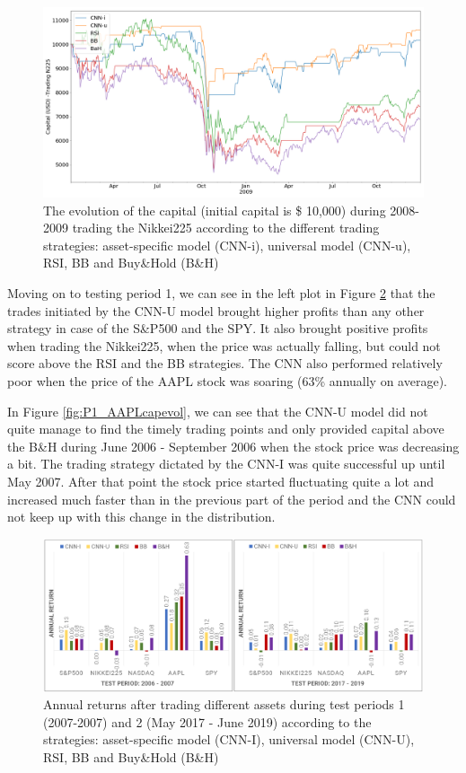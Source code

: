 \documentclass[11pt, a4paper]{article}
\begin{document}
\begin{figure}[ht]
    \centering
    \includegraphics[width=\textwidth]{images/capitals/Capitals2_N225.png}
    \caption{The evolution of the capital (initial capital is \$ 10,000) during 2008-2009 trading the Nikkei225 according to the different trading strategies: asset-specific model (CNN-i), universal model (CNN-u), RSI, BB and Buy\&Hold (B\&H)}
    \label{fig:N225capevol}
\end{figure}

Moving on to testing period 1, we can see in the left plot in Figure \ref{fig:CNNvsComp_P1P3} that the trades initiated by the CNN-U model brought higher profits than any other strategy in case of the S\&P500 and the SPY. It also brought positive profits when trading the Nikkei225, when the price was actually falling, but could not score above the RSI and the BB strategies. The CNN also performed relatively poor when the price of the AAPL stock was soaring (63\% annually on average). 

In Figure \ref{fig:P1_AAPLcapevol}, we can see that the CNN-U model did not quite manage to find the timely trading points and only provided capital above the B\&H during June 2006 - September 2006 when the stock price was decreasing a bit. The trading strategy dictated by the CNN-I was quite successful up until May 2007. After that point the stock price started fluctuating quite a lot and increased much faster than in the previous part of the period and the CNN could not keep up with this change in the distribution. 

\begin{figure}[H]
    \centering
    \includegraphics[width=\textwidth]{images/CNNvsComp_P1P3.png}
    \caption{Annual returns after trading different assets during test periods 1 (2007-2007) and 2 (May 2017 - June 2019) according to the strategies: asset-specific model (CNN-I), universal model (CNN-U), RSI, BB and Buy\&Hold (B\&H)}
    \label{fig:CNNvsComp_P1P3}
\end{figure}
\end{document}
